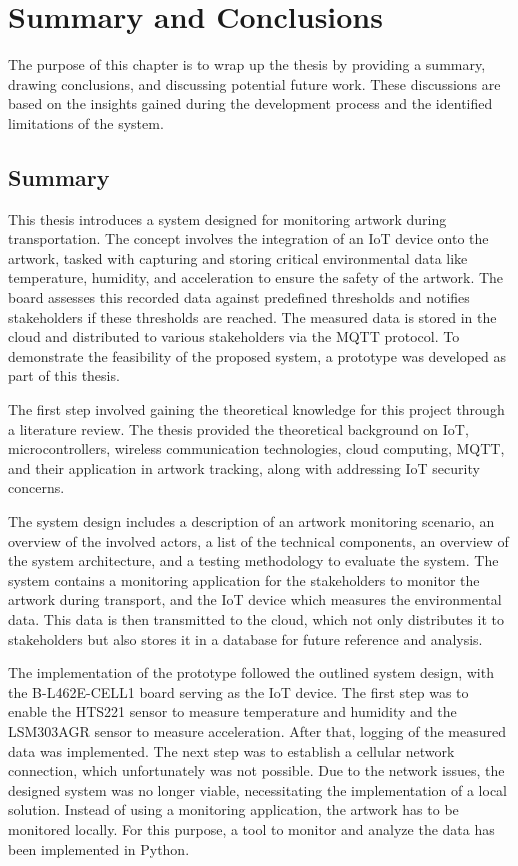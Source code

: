\chapter{Summary and Conclusions}

The purpose of this chapter is to wrap up the thesis by providing a summary, drawing conclusions, and discussing potential future work. These discussions are based on the insights gained during the development process and the identified limitations of the system.

\section{Summary}
This thesis introduces a system designed for monitoring artwork during transportation. The concept involves the integration of an IoT device onto the artwork, tasked with capturing and storing critical environmental data like temperature, humidity, and acceleration to ensure the safety of the artwork. The board assesses this recorded data against predefined thresholds and notifies stakeholders if these thresholds are reached. The measured data is stored in the cloud and distributed to various stakeholders via the MQTT protocol. To demonstrate the feasibility of the proposed system, a prototype was developed as part of this thesis.

The first step involved gaining the theoretical knowledge for this project through a literature review. The thesis provided the theoretical background on IoT, microcontrollers, wireless communication technologies, cloud computing, MQTT, and their application in artwork tracking, along with addressing IoT security concerns.

The system design includes a description of an artwork monitoring scenario, an overview of the involved actors, a list of the technical components, an overview of the system architecture, and a testing methodology to evaluate the system. The system contains a monitoring application for the stakeholders to monitor the artwork during transport, and the IoT device which measures the environmental data. This data is then transmitted to the cloud, which not only distributes it to stakeholders but also stores it in a database for future reference and analysis.

The implementation of the prototype followed the outlined system design, with the B-L462E-CELL1 board serving as the IoT device. The first step was to enable the HTS221 sensor to measure temperature and humidity and the LSM303AGR sensor to measure acceleration. After that, logging of the measured data was implemented. The next step was to establish a cellular network connection, which unfortunately was not possible. Due to the network issues, the designed system was no longer viable, necessitating the implementation of a local solution. Instead of using a monitoring application, the artwork has to be monitored locally. For this purpose, a tool to monitor and analyze the data has been implemented in Python.

